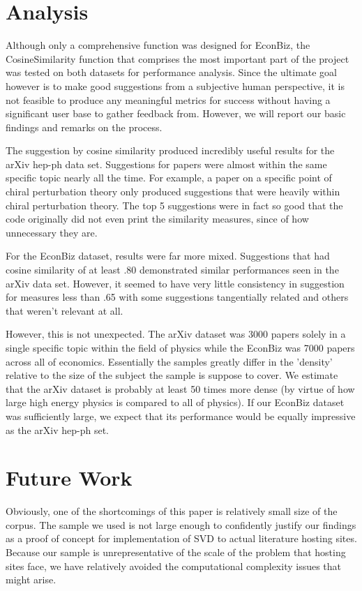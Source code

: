\documentclass [12pt]{article}
\begin{document}
\section{Analysis} 

Although only a comprehensive function was designed for EconBiz, the CosineSimilarity function that comprises the most important part of the project was tested on both datasets for performance analysis. Since the ultimate goal however is to make good suggestions from a subjective human perspective, it is not feasible to produce any meaningful metrics for success without having a significant user base to gather feedback from. However, we will report our basic findings and remarks on the process. 

The suggestion by cosine similarity produced incredibly useful results for the arXiv hep-ph data set. Suggestions for papers were almost within the same specific topic nearly all the time. For example, a paper on a specific point of chiral perturbation theory only produced suggestions that were heavily within chiral perturbation theory. The top 5 suggestions were in fact so good that the code originally did not even print the similarity measures, since of how unnecessary they are. 

For the EconBiz dataset, results were far more mixed. Suggestions that had cosine similarity of at least .80 demonstrated similar performances seen in the arXiv data set. However, it seemed to have very little consistency in suggestion for measures less than .65 with some suggestions tangentially related and others that weren't relevant at all. 

However, this is not unexpected. The arXiv dataset was 3000 papers solely in a single specific topic within the field of physics while the EconBiz was 7000 papers across all of economics. Essentially the samples greatly differ in the 'density' relative to the size of the subject the sample is suppose to cover. We estimate that the arXiv dataset is probably at least 50 times more dense (by virtue of how large high energy physics is compared to all of physics). If our EconBiz dataset was sufficiently large, we expect that its performance would be equally impressive as the arXiv hep-ph set.

\section{Future Work}

Obviously, one of the shortcomings of this paper is relatively small size of the corpus. The sample we used is not large enough to confidently justify our findings as a proof of concept for implementation of SVD to actual literature hosting sites. Because our sample is unrepresentative of the scale of the problem that hosting sites face, we have relatively avoided the computational complexity issues that might arise. 
\end{document}

